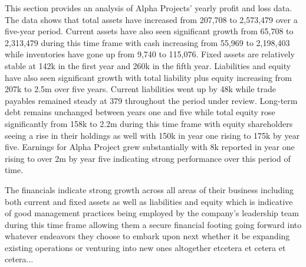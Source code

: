  

This section provides an analysis of Alpha Projects' yearly profit and loss data. The data shows that total assets have increased from 207,708 to 2,573,479 over a five-year period. Current assets have also seen significant growth from 65,708 to 2,313,479 during this time frame with cash increasing from 55,969 to 2,198,403 while inventories have gone up from 9,740 to 115,076. Fixed assets are relatively stable at 142k in the first year and 260k in the fifth year. Liabilities and equity have also seen significant growth with total liability plus equity increasing from 207k to 2.5m over five years. Current liabilities went up by 48k while trade payables remained steady at 379 throughout the period under review. Long-term debt remains unchanged between years one and five while total equity rose significantly from 158k to 2.2m during this time frame with equity shareholders seeing a rise in their holdings as well with 150k in year one rising to 175k by year five. Earnings for Alpha Project grew substantially with 8k reported in year one rising to over 2m by year five indicating strong performance over this period of time. 

The financials indicate strong growth across all areas of their business including both current and fixed assets as well as liabilities and equity which is indicative of good management practices being employed by the company's leadership team during this time frame allowing them a secure financial footing going forward into whatever endeavors they choose to embark upon next whether it be expanding existing operations or venturing into new ones altogether etcetera et cetera et cetera...